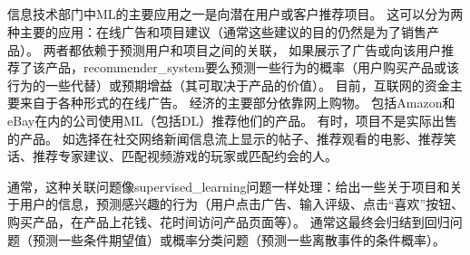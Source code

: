 \subsection{}
\label{sec:recommender_systems}
信息技术部门中\gls{ML}的主要应用之一是向潜在用户或客户推荐项目。
这可以分为两种主要的应用：在线广告和项目建议（通常这些建议的目的仍然是为了销售产品）。
两者都依赖于预测用户和项目之间的关联， 如果展示了广告或向该用户推荐了该产品，\gls{recommender_system}要么预测一些行为的概率（用户购买产品或该行为的一些代替）或预期增益（其可取决于产品的价值）。
目前，互联网的资金主要来自于各种形式的在线广告。
经济的主要部分依靠网上购物。 
包括Amazon和eBay在内的公司使用\gls{ML}（包括\gls{DL}）推荐他们的产品。
有时，项目不是实际出售的产品。
如选择在社交网络新闻信息流上显示的帖子、推荐观看的电影、推荐笑话、推荐专家建议、匹配视频游戏的玩家或匹配约会的人。

通常，这种关联问题像\gls{supervised_learning}问题一样处理：给出一些关于项目和关于用户的信息，预测感兴趣的行为（用户点击广告、输入评级、点击``喜欢''按钮、 购买产品，在产品上花钱、花时间访问产品页面等）。
通常这最终会归结到回归问题（预测一些条件期望值）或概率分类问题（预测一些离散事件的条件概率）。

